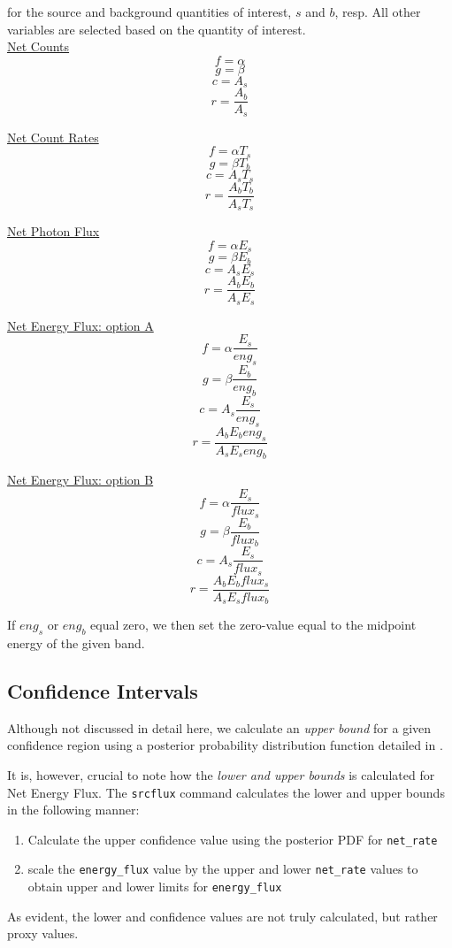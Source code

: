 \documentclass[11pt,letterpaper]{article}
\begin{document}
for the source and background quantities of interest, $s$ and $b$, resp. All other variables are selected based on the quantity of interest.\\
\underline{Net Counts}
$$f = \alpha $$
$$g = \beta $$
$$c = A_s$$
$$r = \frac{A_b}{A_s}$$

\underline{Net Count Rates}
$$f = \alpha T_s$$
$$g = \beta T_b$$
$$c = A_s T_s$$
$$r = \frac{A_bT_b}{A_sT_s}$$

\underline{Net Photon Flux}
$$f = \alpha E_s$$
$$g = \beta E_b$$
$$c = A_s E_s$$
$$r = \frac{A_bE_b}{A_sE_s}$$

\underline{Net Energy Flux: option A}
$$f = \alpha \frac{E_s}{eng_s}$$
$$g = \beta  \frac{E_b}{eng_b}$$
$$c = A_s  \frac{E_s}{eng_s}$$
$$r = \frac{A_bE_beng_s}{A_sE_seng_b}$$

\underline{Net Energy Flux: option B}
$$f = \alpha \frac{E_s}{flux_s}$$
$$g = \beta  \frac{E_b}{flux_b}$$
$$c = A_s  \frac{E_s}{flux_s}$$
$$r = \frac{A_bE_bflux_s}{A_sE_sflux_b}$$

If $eng_s$ or $eng_b$ equal zero, we then set the zero-value equal to the midpoint energy of the given band.
\subsection{Confidence Intervals}
Although not discussed in detail here, we calculate an \textit{upper bound} for a given confidence region using a posterior probability distribution function detailed in \cite{Kashyap}.

It is, however, crucial to note how the \textit{lower and upper bounds} is calculated for Net Energy Flux. The \texttt{srcflux} command calculates the lower and upper bounds in the following manner: 
\begin{enumerate}
	\item Calculate the upper confidence value using the posterior PDF for \texttt{net\_rate}
	\item scale the \texttt{energy\_flux} value by the upper and lower \texttt{net\_rate} values to obtain upper and lower limits for \texttt{energy\_flux}  
\end{enumerate}

As evident, the lower and confidence values are not truly calculated, but rather proxy values.







\newpage


\end{document}
